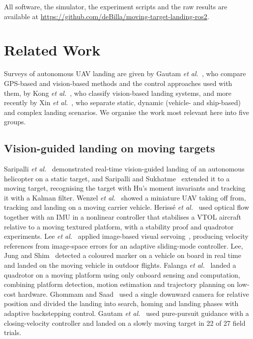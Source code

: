 \documentclass[conference]{IEEEtran}
\begin{document}
All software, the simulator, the experiment scripts and the raw results are available at
\url{https://github.com/deBilla/moving-target-landing-ros2}.

\section{Related Work}
\label{sec:related}

Surveys of autonomous UAV landing are given by Gautam \emph{et al.}~\cite{gautam2014survey},
who compare GPS-based and vision-based methods and the control approaches used with them, by
Kong \emph{et al.}~\cite{kong2014vision}, who classify vision-based landing systems, and more
recently by Xin \emph{et al.}~\cite{xin2022vision}, who separate static, dynamic (vehicle- and
ship-based) and complex landing scenarios. We organise the work most relevant here into five
groups.

\subsection{Vision-guided landing on moving targets}
Saripalli \emph{et al.}~\cite{saripalli2003visually} demonstrated real-time vision-guided
landing of an autonomous helicopter on a static target, and Saripalli and
Sukhatme~\cite{saripalli2006landing} extended it to a moving target, recognising the target
with Hu's moment invariants and tracking it with a Kalman filter. Wenzel
\emph{et al.}~\cite{wenzel2011automatic} showed a miniature UAV taking off from, tracking and
landing on a moving carrier vehicle. Heriss\'e \emph{et al.}~\cite{herisse2012landing} used
optical flow together with an IMU in a nonlinear controller that stabilises a VTOL aircraft
relative to a moving textured platform, with a stability proof and quadrotor experiments. Lee
\emph{et al.}~\cite{lee2012autonomous} applied image-based visual
servoing~\cite{chaumette2006visual}, producing velocity references from image-space errors for
an adaptive sliding-mode controller. Lee, Jung and Shim~\cite{lee2016vision} detected a
coloured marker on a vehicle on board in real time and landed on the moving vehicle in outdoor
flights. Falanga \emph{et al.}~\cite{falanga2017vision} landed a quadrotor on a moving platform
using only onboard sensing and computation, combining platform detection, motion estimation
and trajectory planning on low-cost hardware. Ghommam and Saad~\cite{ghommam2017autonomous}
used a single downward camera for relative position and divided the landing into search,
homing and landing phases with adaptive backstepping control. Gautam
\emph{et al.}~\cite{gautam2022autonomous} used pure-pursuit guidance with a closing-velocity
controller and landed on a slowly moving target in 22 of 27 field trials.
\end{document}
